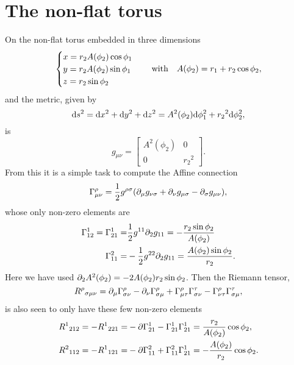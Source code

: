 \documentclass[11pt,a4paper, 
swedish, english %
]{article}
\begin{document}
\section{The non-flat torus}
On the non-flat torus embedded in three dimensions 
\begin{equation}
\begin{cases}
x=r_2A(\phi_2)\cos\phi_1\\
y=r_2A(\phi_2)\sin\phi_1\\
z=r_2\sin\phi_2
\end{cases}
\qq{with}
A(\phi_2)=r_1+r_2\cos\phi_2,
\end{equation}
and the metric, given by 
\begin{equation}
\mathrm{d}{s}^2=\mathrm{d}{x}^2+\mathrm{d}{y}^2+\mathrm{d}{z}^2
=A^2(\phi_2)\mathrm{d}\phi_1^2+{r_2}^2\mathrm{d}\phi_2^2,
\end{equation}
is
\begin{equation}
g_{\mu\nu}=
\begin{bmatrix}
A^2(\phi_2)&0\\
0&{r_2}^2
\end{bmatrix}.
\end{equation}
From this it is a simple task to compute the Affine connection
\begin{equation}
\Gamma^\rho_{\mu\nu}=\frac{1}{2}g^{\rho\sigma}
\qty(\partial_{\mu}g_{\nu\sigma}+\partial_{\nu}g_{\mu\sigma}-\partial_{\sigma}g_{\mu\nu}),
\end{equation}
whose only non-zero elements are 
\begin{equation}\label{eq11:affine}
\begin{aligned}
\Gamma^1_{12}=\Gamma^1_{21}
=&\frac{1}{2}g^{11}\partial_2g_{11}
=-\frac{r_2\sin\phi_2}{A(\phi_2)}\\
\Gamma^2_{11}=&-\frac{1}{2}g^{22}\partial_2g_{11}
=\frac{A(\phi_2)\sin\phi_2}{r_2}.
\end{aligned}
\end{equation}
Here we have used $\partial_2A^2(\phi_2)=-2A(\phi_2){r_2}\sin\phi_2$. Then
the Riemann tensor,
\begin{equation}
{R^\rho}_{\sigma\mu\nu}=
\partial_{\mu}\Gamma^\rho_{\sigma\nu}-\partial_{\nu}\Gamma^\rho_{\sigma\mu}
+\Gamma^\rho_{\mu\tau}\Gamma^\tau_{\sigma\nu}
-\Gamma^\rho_{\nu\tau}\Gamma^\tau_{\sigma\mu},
\end{equation}
is also seen to only have these few non-zero elements
\begin{equation}
\begin{aligned}
{R^1}_{212}=-{R^1}_{221}=&-\partial\Gamma^1_{21}-\Gamma^1_{21}\Gamma^1_{21}
=\frac{r_2}{A(\phi_2)}\cos\phi_2,\\
{R^2}_{112}=-{R^1}_{121}=&-\partial\Gamma^2_{11}+\Gamma^2_{11}\Gamma^1_{21}
=-\frac{A(\phi_2)}{r_2}\cos\phi_2.
\end{aligned}
\end{equation}
\end{document}
